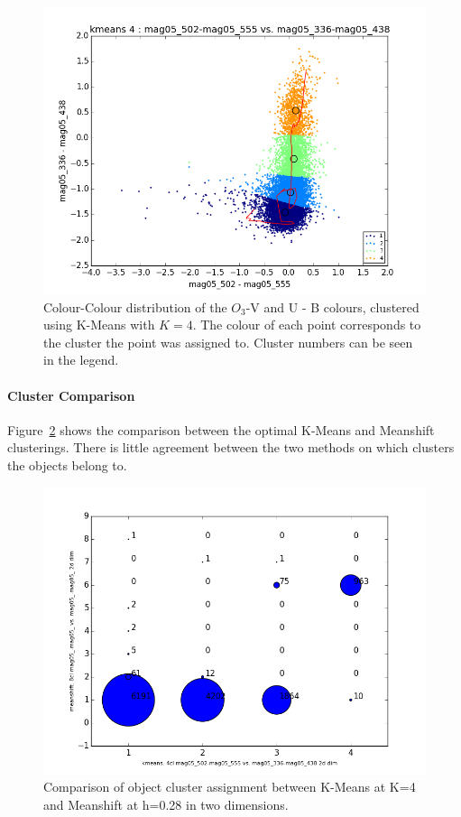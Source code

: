 \begin{figure}
\centering
\includegraphics[width=\linewidth]{figs/unsuccessful/kmeans_color_4cl_mag05_502-mag05_555vsmag05_336-mag05_438}
\caption{Colour-Colour distribution of the $O_{3}$-V and U - B colours, clustered using K-Means with $K=4$. The colour of each point corresponds to the cluster the point was assigned to. Cluster numbers can be seen in the legend.}
\label{fig:OIIIV2dKM}
\end{figure}

\paragraph{Cluster Comparison}
Figure~\ref{fig:OIIIV2dcomp} shows the comparison between the optimal K-Means and Meanshift clusterings.
There is little agreement between the two methods on which clusters the objects belong to.

\begin{figure}[H]
\centering
\includegraphics[width=\linewidth]{figs/unsuccessful/kmeans-4cl_mag05_502-mag05_555_vs_meanshift-8cl_mag05_-mag05__mag05_-mag05__2ddim_compare}
\caption{Comparison of object cluster assignment between K-Means at K=4 and Meanshift at h=0.28 in two dimensions.}
\label{fig:OIIIV2dcomp}
\end{figure}

